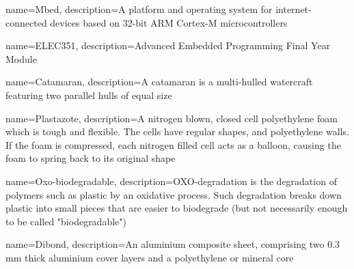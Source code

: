 
{
    name=Mbed,
    description={A platform and operating system for internet-connected devices based on 32-bit ARM Cortex-M microcontrollers}
}

{
    name=ELEC351,
    description={Advanced Embedded Programming Final Year Module}
}


{
    name=Catamaran,
    description={A catamaran is a multi-hulled watercraft featuring two parallel hulls of equal size}
}

{
	name=Plastazote,
	description={A nitrogen blown, closed cell polyethylene foam which is tough and flexible. The cells have regular shapes, and polyethylene walls. If the foam is compressed, each nitrogen filled cell acts as a balloon, causing the foam to spring back to its original shape}
}

{
	name=Oxo-biodegradable,
	description={OXO-degradation is the degradation of polymers such as plastic by an oxidative process. Such degradation breaks down plastic into small pieces that are easier to biodegrade (but not necessarily enough to be called "biodegradable")}
}

{
	name=Dibond,
	description={An aluminium composite sheet, comprising two 0.3 mm thick aluminium cover layers and a polyethylene or mineral core}
}

